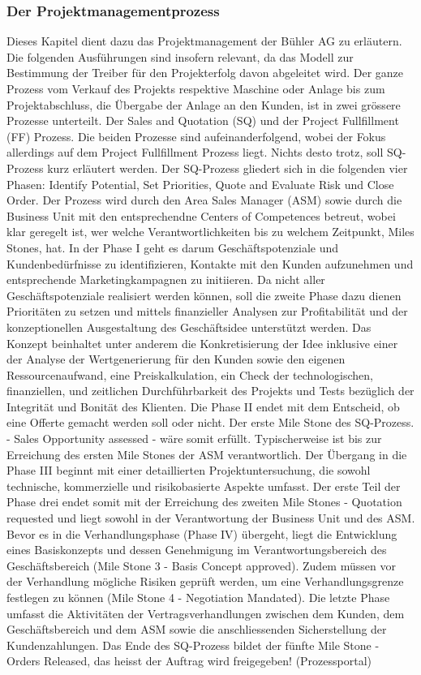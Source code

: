 \subsubsection{Der Projektmanagementprozess}\label{zweieins}
	
Dieses Kapitel dient dazu das Projektmanagement der Bühler AG zu erläutern. Die folgenden Ausführungen sind insofern relevant, da das Modell zur Bestimmung der Treiber für den Projekterfolg davon abgeleitet wird. 
\newline
Der ganze Prozess vom Verkauf des Projekts respektive Maschine oder Anlage bis zum Projektabschluss, die Übergabe der Anlage an den Kunden, ist in zwei grössere Prozesse unterteilt. Der Sales and Quotation (SQ) und der Project Fullfillment (FF) Prozess. Die beiden Prozesse sind aufeinanderfolgend, wobei der Fokus allerdings auf dem Project Fullfillment Prozess liegt. Nichts desto trotz, soll SQ-Prozess kurz erläutert werden. Der SQ-Prozess gliedert sich in die folgenden vier Phasen: Identify Potential, Set Priorities, Quote and Evaluate Risk und Close Order. Der Prozess wird durch den Area Sales Manager (ASM) sowie durch die Business Unit mit den entsprechendne Centers of Competences betreut, wobei klar geregelt ist, wer welche Verantwortlichkeiten bis zu welchem Zeitpunkt, Miles Stones, hat. In der Phase I geht es darum Geschäftspotenziale und Kundenbedürfnisse zu identifizieren, Kontakte mit den Kunden aufzunehmen und entsprechende Marketingkampagnen zu initiieren. Da nicht aller Geschäftspotenziale realisiert werden können, soll die zweite Phase dazu dienen Prioritäten zu setzen und mittels finanzieller Analysen zur Profitabilität und der konzeptionellen Ausgestaltung des Geschäftsidee unterstützt werden. Das Konzept beinhaltet unter anderem die Konkretisierung der Idee inklusive einer der Analyse der Wertgenerierung für den Kunden sowie den eigenen Ressourcenaufwand, eine Preiskalkulation, ein Check der technologischen, finanziellen, und zeitlichen Durchführbarkeit des Projekts und Tests bezüglich der Integrität und Bonität des Klienten. Die Phase II endet mit dem Entscheid, ob eine Offerte gemacht werden soll oder nicht. Der erste Mile Stone des SQ-Prozess. - Sales Opportunity assessed -  wäre somit erfüllt. Typischerweise ist bis zur Erreichung des ersten Mile Stones der ASM verantwortlich. Der Übergang in die Phase III beginnt mit einer detaillierten Projektuntersuchung, die sowohl technische, kommerzielle und risikobasierte Aspekte umfasst. Der erste Teil der Phase drei endet somit mit der Erreichung des zweiten Mile Stones  - Quotation requested und liegt sowohl in der Verantwortung der Business Unit und des ASM. Bevor es in die Verhandlungsphase (Phase IV) übergeht, liegt die Entwicklung eines Basiskonzepts und dessen Genehmigung im Verantwortungsbereich des Geschäftsbereich (Mile Stone 3 - Basis Concept approved). Zudem müssen vor der Verhandlung mögliche Risiken geprüft werden, um eine Verhandlungsgrenze festlegen zu können (Mile Stone 4 - Negotiation Mandated). Die letzte Phase umfasst die Aktivitäten der Vertragsverhandlungen zwischen dem Kunden, dem Geschäftsbereich und dem ASM sowie die anschliessenden Sicherstellung der Kundenzahlungen. Das Ende des SQ-Prozess bildet der fünfte Mile Stone -  Orders Released, das heisst der Auftrag wird freigegeben! (Prozessportal)
